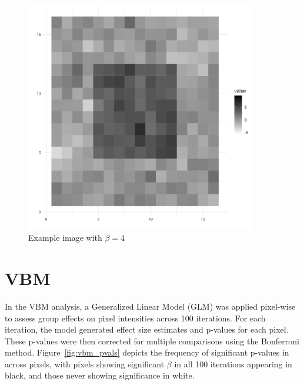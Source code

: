 \documentclass[12pt]{article}
\begin{document}
\begin{figure}[H]
    \begin{minipage}{0.45\textwidth}
        \centering
        \includegraphics[width=0.9\textwidth]{../Figures/ex_image_4.png}
        \caption{Example image with \(\beta = 4\)}
        \label{fig:image3}
    \end{minipage}\hfill
    \begin{minipage}{0.45\textwidth}
    \end{minipage}
\end{figure}

\section*{VBM}

In the VBM analysis, a Generalized Linear Model (GLM) was applied pixel-wise to assess group effects on pixel intensities across 100 iterations. For each iteration, the model generated effect size estimates and p-values for each pixel. These p-values were then corrected for multiple comparisons using the Bonferroni method. Figure~\ref{fig:vbm_pvals} depicts the frequency of significant p-values in across pixels, with pixels showing significant \(\beta\) in all 100 iterations appearing in black, and those never showing significance in white.
\end{document}

